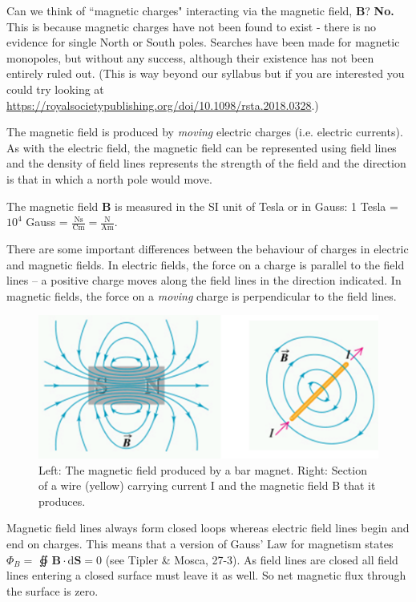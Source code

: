 \documentclass[
]{book}
\numberwithin{equation}{section}
\begin{document}
Can we think of ``magnetic charges" interacting via the magnetic field,
\(\mathbf{B}\)? \textbf{No.} This is because magnetic charges have not been found to
exist - there is no evidence for single North or South poles. Searches
have been made for magnetic monopoles, but without any success, although
their existence has not been entirely ruled out. (This is way beyond our
syllabus but if you are interested you could try looking at
\url{https://royalsocietypublishing.org/doi/10.1098/rsta.2018.0328}.)

The magnetic field is produced by \emph{moving} electric charges (i.e.
electric currents). As with the electric field, the magnetic field can
be represented using field lines and the density of field lines
represents the strength of the field and the direction is that in which
a north pole would move.

The magnetic field \(\mathbf{B}\) is measured in the SI unit of Tesla or in Gauss:
1 Tesla = \(10^4\) Gauss =
\(\frac{\mathrm{Ns}}{\mathrm{Cm}} = \frac{\mathrm{N}}{\mathrm{Am}}\).

There are some important differences between the behaviour of charges in
electric and magnetic fields. In electric fields, the force on a charge
is parallel to the field lines -- a positive charge moves along the
field lines in the direction indicated. In magnetic fields, the force on
a \emph{moving} charge is perpendicular to the field lines.

\begin{figure}

{\centering \includegraphics[width=0.7\linewidth]{Figures/MagFields} 

}

\caption{Left: The magnetic field produced by a bar magnet. Right: Section of a wire (yellow) carrying current I and the magnetic field B that it produces.}\label{fig:MagFields}
\end{figure}

Magnetic field lines always form closed loops whereas electric field
lines begin and end on charges. This means that a version of Gauss' Law
for magnetism states \(\Phi_B =\) ∯ \(\mathbf{B} \cdot \mathrm{d} \mathbf{S} = 0\) (see Tipler \&
Mosca, 27-3). As field lines are closed all field lines entering a
closed surface must leave it as well. So net magnetic flux through the
surface is zero.
\end{document}
